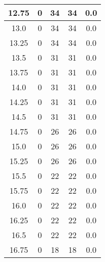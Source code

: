 \documentclass[letterpaper, 12pt]{article}
\begin{document}
\begin{longtable}{|c|c|c|c|c|}
\hline
12.75 & 0 & 34 & 34 & 0.0 \\
\hline
13.0 & 0 & 34 & 34 & 0.0 \\
\hline
13.25 & 0 & 34 & 34 & 0.0 \\
\hline
13.5 & 0 & 31 & 31 & 0.0 \\
\hline
13.75 & 0 & 31 & 31 & 0.0 \\
\hline
14.0 & 0 & 31 & 31 & 0.0 \\
\hline
14.25 & 0 & 31 & 31 & 0.0 \\
\hline
14.5 & 0 & 31 & 31 & 0.0 \\
\hline
14.75 & 0 & 26 & 26 & 0.0 \\
\hline
15.0 & 0 & 26 & 26 & 0.0 \\
\hline
15.25 & 0 & 26 & 26 & 0.0 \\
\hline
15.5 & 0 & 22 & 22 & 0.0 \\
\hline
15.75 & 0 & 22 & 22 & 0.0 \\
\hline
16.0 & 0 & 22 & 22 & 0.0 \\
\hline
16.25 & 0 & 22 & 22 & 0.0 \\
\hline
16.5 & 0 & 22 & 22 & 0.0 \\
\hline
16.75 & 0 & 18 & 18 & 0.0 \\
\hline
\end{longtable}
\end{document}
